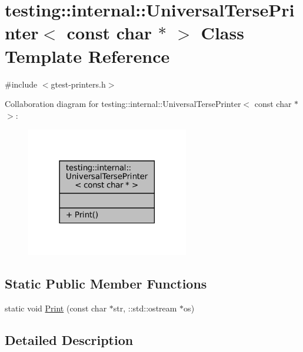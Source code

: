 \hypertarget{classtesting_1_1internal_1_1UniversalTersePrinter_3_01const_01char_01_5_01_4}{}\section{testing\+:\+:internal\+:\+:Universal\+Terse\+Printer$<$ const char $\ast$ $>$ Class Template Reference}
\label{classtesting_1_1internal_1_1UniversalTersePrinter_3_01const_01char_01_5_01_4}


{\ttfamily \#include $<$gtest-\/printers.\+h$>$}



Collaboration diagram for testing\+:\+:internal\+:\+:Universal\+Terse\+Printer$<$ const char $\ast$ $>$\+:
\nopagebreak
\begin{figure}[H]
\begin{center}
\leavevmode
\includegraphics[width=201pt]{classtesting_1_1internal_1_1UniversalTersePrinter_3_01const_01char_01_5_01_4__coll__graph}
\end{center}
\end{figure}
\subsection*{Static Public Member Functions}
\begin{DoxyCompactItemize}
\item 
static void \hyperlink{classtesting_1_1internal_1_1UniversalTersePrinter_3_01const_01char_01_5_01_4_a37a3be2d26dc07b24d16c2b5eb88ecda}{Print} (const char $\ast$str, \+::std\+::ostream $\ast$os)
\end{DoxyCompactItemize}


\subsection{Detailed Description}
